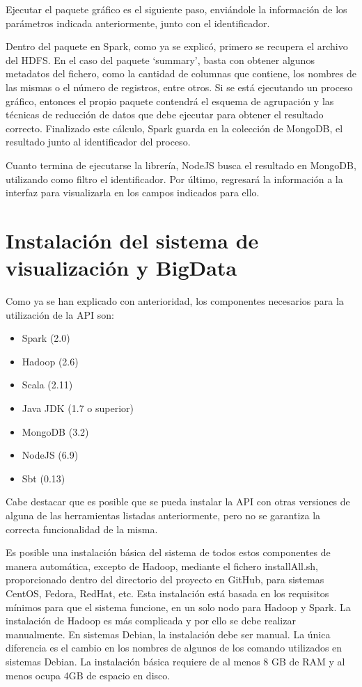 Ejecutar el paquete gráfico es el siguiente paso, enviándole la información de los parámetros indicada anteriormente, junto con el identificador. 

Dentro del paquete en Spark, como ya se explicó, primero se recupera el archivo del HDFS. En el caso del paquete ‘summary’, basta con obtener algunos metadatos del fichero, como la cantidad de columnas que contiene, los nombres de las mismas o el número de registros, entre otros. Si se está ejecutando un proceso gráfico, entonces el propio paquete contendrá el esquema de agrupación y las técnicas de reducción de datos que debe ejecutar para obtener el resultado correcto. Finalizado este cálculo, Spark guarda en la colección de MongoDB, el resultado junto al identificador del proceso. 

Cuanto termina de ejecutarse la librería, NodeJS busca el resultado en MongoDB, utilizando como filtro el identificador. Por último, regresará la información a la interfaz para visualizarla en los campos indicados para ello.

\section{Instalación del sistema de visualización y BigData}

Como ya se han explicado con anterioridad, los componentes necesarios para la utilización de la API son:
\begin{itemize}
	\item Spark (2.0)
	\item Hadoop (2.6)
	\item Scala (2.11)
	\item Java JDK (1.7 o superior)
	\item MongoDB (3.2)
	\item NodeJS (6.9)
	\item Sbt (0.13)
\end{itemize}

Cabe destacar que es posible que se pueda instalar la API con otras versiones de alguna de las herramientas listadas anteriormente, pero no se garantiza la correcta funcionalidad de la misma.

Es posible una instalación básica del sistema de todos estos componentes de manera automática, excepto de Hadoop, mediante el fichero installAll.sh, proporcionado dentro del directorio del proyecto en GitHub, para sistemas CentOS, Fedora, RedHat, etc. Esta instalación está basada en los requisitos mínimos para que el sistema funcione, en un solo nodo para Hadoop y Spark. La instalación de Hadoop es más complicada y por ello se debe realizar manualmente. En sistemas Debian, la instalación debe ser manual. La única diferencia es el cambio en los nombres de algunos de los comando utilizados en sistemas Debian. La instalación básica requiere de al menos 8 GB de RAM y al menos ocupa 4GB de espacio en disco.


